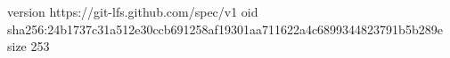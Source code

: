 version https://git-lfs.github.com/spec/v1
oid sha256:24b1737c31a512e30ccb691258af19301aa711622a4c6899344823791b5b289e
size 253
